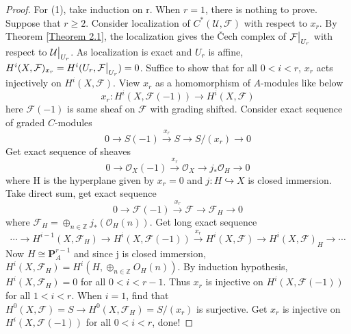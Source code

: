 \documentclass{ctexart}
\begin{document}
\begin{proof}
    \par
    For (1), take induction on r.
    When $r = 1$, there is nothing to prove.
    Suppose that $r \ge 2$.
    Consider localization of $C^{\ast}(\mathcal{U}, \mathcal{F})$ with respect to $x_{r}$.
    By Theorem \ref{Theorem 2.1}, the localization gives the Čech complex of $\mathcal{F}\big{|}_{U_{r}}$ with respect to $\mathcal{U}\big{|}_{U_{r}}$.
    As localization is exact and $U_{r}$ is affine, $H^{i}(X, \mathcal{F})_{x_{r}} = H^{i}(U_{r}, \mathcal{F}\big{|}_{U_{r}}) = 0$.
    Suffice to show that for all $0 < i < r$, $x_{r}$ acts injectively on $H^{i}(X, \mathcal{F})$.
    View $x_{r}$ as a homomorphism of $A$-modules like below
    \begin{equation*}
        x_{r}: H^{i}(X, \mathcal{F}(-1)) \longrightarrow H^{i}(X, \mathcal{F})
    \end{equation*}
    here $\mathcal{F}(-1)$ is same sheaf on $\mathcal{F}$ with grading shifted.
    Consider exact sequence of graded $C$-modules 
    \begin{equation*}
        0 \longrightarrow S(-1) \overset{x_{r}}{\longrightarrow} S \longrightarrow S/(x_{r}) \longrightarrow 0
    \end{equation*}
    Get exact sequence of sheaves 
    \begin{equation*}
        0 \longrightarrow \mathcal{O}_{X}(-1) \overset{x_{r}}{\longrightarrow} \mathcal{O}_{X} \longrightarrow j_{\ast}\mathcal{O}_{H} \longrightarrow 0
    \end{equation*}
    where H is the hyperplane given by $x_{r} = 0$ and $j: H \hookrightarrow X$ is closed immersion. 
    Take direct sum, get exact sequence
    \begin{equation*}
        0 \longrightarrow \mathcal{F}(-1) \overset{x_{r}}{\longrightarrow} \mathcal{F} \longrightarrow \mathcal{F}_{H} \longrightarrow 0
    \end{equation*}
    where $\mathcal{F}_{H} = \oplus_{n\in \mathbb{Z}} j_{\ast}(\mathcal{O}_{H}(n))$. 
    Get long exact sequence
    \begin{equation*}
        \cdots \longrightarrow H^{i - 1}(X, \mathcal{F}_{H}) \longrightarrow H^{i}(X, \mathcal{F}(-1)) \overset{x_{r}}{\longrightarrow} H^{i}(X, \mathcal{F}) \longrightarrow H^{i}(X, \mathcal{F})_{H} \longrightarrow \cdots
    \end{equation*}
    Now $H \cong \mathbf{P}^{r - 1}_{A}$ and since j is closed immersion, $H^{i}(X, \mathcal{F}_{H}) = H^{i}(H, \oplus_{n\in \mathbb{Z}} O_{H}(n))$.
    By induction hypothesis, $H^{i}(X, \mathcal{F}_{H}) = 0$ for all $0 < i < r - 1$.
    Thus $x_{r}$ is injective on $H^{i}(X, \mathcal{F}(-1))$ for all $1 < i < r$.
    When $i = 1$, find that $H^{0}(X, \mathcal{F}) = S \longrightarrow H^{0}(X, \mathcal{F}_{H}) = S/(x_{r})$ is surjective.
    Get $x_{r}$ is injective on $H^{i}(X, \mathcal{F}(-1))$ for all $0 < i < r$, done!
\end{proof}
\end{document}
